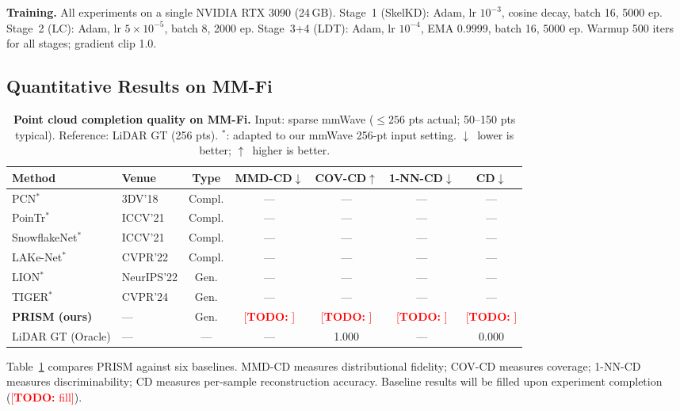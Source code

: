 \documentclass{article}
\newcommand{\todo}[1]{\textcolor{red}{[\textbf{TODO:} #1]}}
\begin{document}
\textbf{Training.}
All experiments on a single NVIDIA RTX 3090 (24\,GB).
Stage~1 (SkelKD): Adam, lr $10^{-3}$, cosine decay, batch 16, 5000 ep.
Stage~2 (LC): Adam, lr $5\!\times\!10^{-5}$, batch 8, 2000 ep.
Stage~3+4 (LDT): Adam, lr $10^{-4}$, EMA 0.9999, batch 16, 5000 ep.
Warmup 500 iters for all stages; gradient clip 1.0.

\subsection{Quantitative Results on MM-Fi}
\label{sec:quant}

\begin{table}[t]
  \centering
  \caption{
    \textbf{Point cloud completion quality on MM-Fi.}
    Input: sparse mmWave ($\leq\!256$ pts actual; 50--150 pts typical).
    Reference: LiDAR GT (256 pts).
    $^*$: adapted to our mmWave 256-pt input setting.
    $\downarrow$~lower is better; $\uparrow$~higher is better.
  }
  \label{tab:main}
  \small
  \setlength{\tabcolsep}{5pt}
  \begin{tabular}{llccccc}
    \toprule
    Method & Venue & Type
           & MMD-CD$\downarrow$ & COV-CD$\uparrow$
           & 1-NN-CD$\downarrow$ & CD$\downarrow$ \\
    \midrule
    PCN$^*$~\cite{pcn}            & 3DV'18      & Compl. & ---  & ---  & ---  & ---  \\
    PoinTr$^*$~\cite{pointr}      & ICCV'21     & Compl. & ---  & ---  & ---  & ---  \\
    SnowflakeNet$^*$~\cite{snowflake} & ICCV'21  & Compl. & ---  & ---  & ---  & ---  \\
    LAKe-Net$^*$~\cite{lakenet}   & CVPR'22     & Compl. & ---  & ---  & ---  & ---  \\
    LION$^*$~\cite{lion}          & NeurIPS'22  & Gen.   & ---  & ---  & ---  & ---  \\
    TIGER$^*$~\cite{tiger}        & CVPR'24     & Gen.   & ---  & ---  & ---  & ---  \\
    \midrule
    \rowcolor{green!8}
    \textbf{PRISM (ours)}  & ---  & Gen.
      & \todo{} & \todo{} & \todo{} & \todo{} \\
    \midrule
    LiDAR GT (Oracle)             & ---  & ---    & ---  & 1.000 & ---  & 0.000 \\
    \bottomrule
  \end{tabular}
\end{table}

Table~\ref{tab:main} compares PRISM against six baselines.
MMD-CD measures distributional fidelity; COV-CD measures coverage;
1-NN-CD measures discriminability; CD measures per-sample reconstruction accuracy.
Baseline results will be filled upon experiment completion (\todo{fill}).
\end{document}
